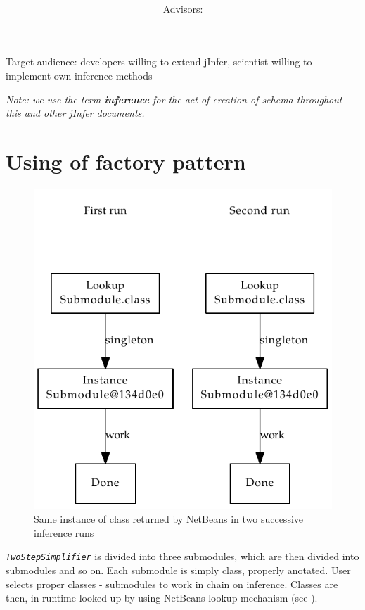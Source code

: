 \documentclass[a4paper,10pt,oneside]{article}
\title{\bf\mftitle}
\author{\mfauthor \\ Advisors: \mfadvisor}
\date{\mfplacedate}
\newcommand{\myscale}{0.74}
\newcommand{\jmodule}[1]{\texttt{\textsl{#1}}}
\begin{document}
\maketitle
\noindent Target audience: developers willing to extend jInfer, scientist willing to implement own inference methods

\noindent \emph{Note: we use the term \textbf{inference} for the act of creation of schema throughout this and other jInfer documents.}

\section{Using of factory pattern}
\begin{figure}
	\centering\includegraphics[scale=\myscale]{factory_pattern1}
	\caption{Same instance of class returned by NetBeans in two successive inference runs} \label{factory_pattern1}
\end{figure}
\jmodule{TwoStepSimplifier} is divided into three submodules, which are then divided into submodules and so on.
Each submodule is simply class, properly anotated.
User selects proper classes - submodules to work in chain on inference.
Classes are then, in runtime looked up by using NetBeans lookup mechanism (see \cite[p. 16]{archdoc}).
\end{document}
